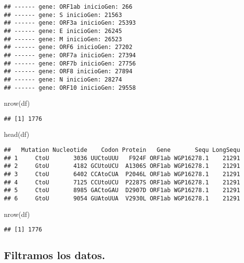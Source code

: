 \documentclass[
]{article}
\newenvironment{Shaded}{\begin{snugshade}}{\end{snugshade}}
\newcommand{\FunctionTok}[1]{\textcolor[rgb]{0.00,0.00,0.00}{#1}}
\newcommand{\NormalTok}[1]{#1}
\begin{document}
\begin{verbatim}
## ------ gene: ORF1ab inicioGen: 266 
## ------ gene: S inicioGen: 21563 
## ------ gene: ORF3a inicioGen: 25393 
## ------ gene: E inicioGen: 26245 
## ------ gene: M inicioGen: 26523 
## ------ gene: ORF6 inicioGen: 27202 
## ------ gene: ORF7a inicioGen: 27394 
## ------ gene: ORF7b inicioGen: 27756 
## ------ gene: ORF8 inicioGen: 27894 
## ------ gene: N inicioGen: 28274 
## ------ gene: ORF10 inicioGen: 29558
\end{verbatim}

\begin{Shaded}
\begin{Highlighting}[]
\FunctionTok{nrow}\NormalTok{(df)}
\end{Highlighting}
\end{Shaded}

\begin{verbatim}
## [1] 1776
\end{verbatim}

\begin{Shaded}
\begin{Highlighting}[]
\FunctionTok{head}\NormalTok{(df)}
\end{Highlighting}
\end{Shaded}

\begin{verbatim}
##   Mutation Nucleotide    Codon Protein   Gene       Sequ LongSequ
## 1     CtoU       3036 UUCtoUUU   F924F ORF1ab WGP16278.1    21291
## 2     GtoU       4182 GCUtoUCU  A1306S ORF1ab WGP16278.1    21291
## 3     CtoU       6402 CCAtoCUA  P2046L ORF1ab WGP16278.1    21291
## 4     CtoU       7125 CCUtoUCU  P2287S ORF1ab WGP16278.1    21291
## 5     CtoU       8985 GACtoGAU  D2907D ORF1ab WGP16278.1    21291
## 6     GtoU       9054 GUAtoUUA  V2930L ORF1ab WGP16278.1    21291
\end{verbatim}

\begin{Shaded}
\begin{Highlighting}[]
\FunctionTok{nrow}\NormalTok{(df)}
\end{Highlighting}
\end{Shaded}

\begin{verbatim}
## [1] 1776
\end{verbatim}

\hypertarget{filtramos-los-datos.}{%
\subsection{Filtramos los datos.}\label{filtramos-los-datos.}}
\end{document}
